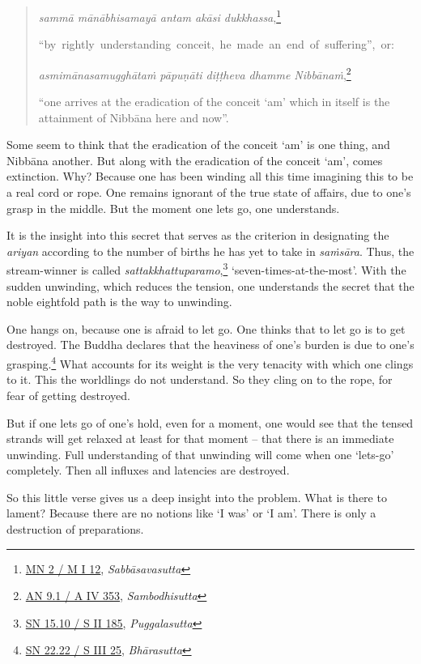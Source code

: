 \begin{quote}
\emph{sammā mānābhisamayā antam akāsi dukkhassa},\footnote{\href{https://suttacentral.net/mn2/pli/ms}{MN 2 / M I 12}, \emph{Sabbāsavasutta}}

\mbox{``by rightly understanding conceit, he made an end of suffering'', or:}

\emph{asmimānasamugghātaṁ pāpuṇāti diṭṭheva dhamme Nibbānaṁ},\footnote{\href{https://suttacentral.net/an9.1/pli/ms}{AN 9.1 / A IV 353}, \emph{Sambodhisutta}}

``one arrives at the eradication of the conceit `am' which in itself is the attainment of Nibbāna here and now''.
\end{quote}

Some seem to think that the eradication of the conceit `am' is one thing, and Nibbāna another. But along with the eradication of the conceit `am', comes extinction. Why? Because one has been winding all this time imagining this to be a real cord or rope. One remains ignorant of the true state of affairs, due to one's grasp in the middle. But the moment one lets go, one understands.

It is the insight into this secret that serves as the criterion in designating the \emph{ariyan} according to the number of births he has yet to take in \emph{saṁsāra}. Thus, the stream-winner is called \emph{sattakkhattuparamo},\footnote{\href{https://suttacentral.net/sn15.10/pli/ms}{SN 15.10 / S II 185}, \emph{Puggalasutta}} `seven-times-at-the-most'. With the sudden unwinding, which reduces the tension, one understands the secret that the noble eightfold path is the way to unwinding.

One hangs on, because one is afraid to let go. One thinks that to let go is to get destroyed. The Buddha declares that the heaviness of one's burden is due to one's grasping.\footnote{\href{https://suttacentral.net/sn22.22/pli/ms}{SN 22.22 / S III 25}, \emph{Bhārasutta}} What accounts for its weight is the very tenacity with which one clings to it. This the worldlings do not understand. So they cling on to the rope, for fear of getting destroyed.

But if one lets go of one's hold, even for a moment, one would see that the tensed strands will get relaxed at least for that moment -- that there is an immediate unwinding. Full understanding of that unwinding will come when one `lets-go' completely. Then all influxes and latencies are destroyed.

So this little verse gives us a deep insight into the problem. What is there to lament? Because there are no notions like `I was' or `I am'. There is only a destruction of preparations.

